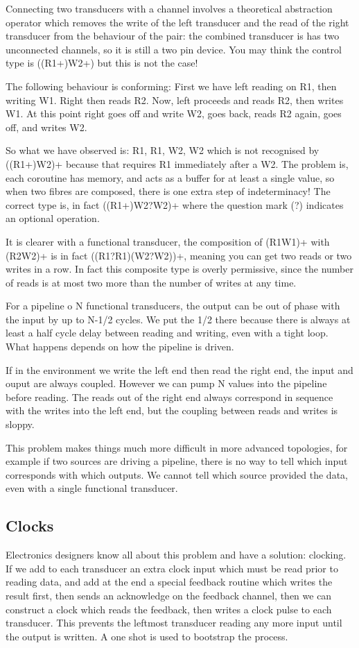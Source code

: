 \documentclass{article}
\begin{document}
Connecting two transducers with a channel involves a theoretical
abstraction operator which removes the write of the left transducer
and the read of the right transducer from the behaviour of the pair:
the combined transducer is has two unconnected channels, so it
is still a two pin device. You may think the control type is
((R1+)W2+) but this is not the case!

The following behaviour is conforming: First we have left
reading on R1, then writing W1. Right then reads R2.
Now, left proceeds and reads R2, then writes W1. At this
point right goes off and write W2, goes back, reads R2
again, goes off, and writes W2.

So what we have observed is: R1, R1, W2, W2 which is not
recognised by ((R1+)W2)+ because that requires R1 immediately
after a W2. The problem is, each coroutine has memory,
and acts as a buffer for at least a single value, so when
two fibres are composed, there is one extra step of 
indeterminacy! The correct type is, in fact ((R1+)W2?W2)+
where the question mark (?) indicates an optional operation.

It is clearer with a functional transducer, the composition
of (R1W1)+ with (R2W2)+ is in fact ((R1?R1)(W2?W2))+, meaning
you can get two reads or two writes in a row. In fact this
composite type is overly permissive, since the number
of reads is at most two more than the number of writes 
at any time.

For a pipeline o N functional transducers, the output can be out of phase
with the input by up to N-1/2 cycles. We put the 1/2 there because
there is always at least a half cycle delay between reading and writing,
even with a tight loop. What happens depends on how the pipeline is driven.

If in the environment we write the left end then read the right end,
the input and ouput are always coupled. However we can pump N values
into the pipeline before reading. The reads out of the right end
always correspond in sequence with the writes into the left end,
but the coupling between reads and writes is sloppy.

This problem makes things much more difficult in more advanced
topologies, for example if two sources are driving a pipeline,
there is no way to tell which input corresponds with which
outputs. We cannot tell which source provided the data, even
with a single functional transducer.

\subsection{Clocks}
Electronics designers know all about this problem and have
a solution: clocking. If we add to each transducer an
extra clock input which must be read prior to reading data,
and add at the end a special feedback routine which writes
the result first, then sends an acknowledge on the feedback
channel, then we can construct a clock which reads the feedback,
then writes a clock pulse to each transducer. This prevents
the leftmost transducer reading any more input until the
output is written. A one shot is used to bootstrap the process.
\end{document}
